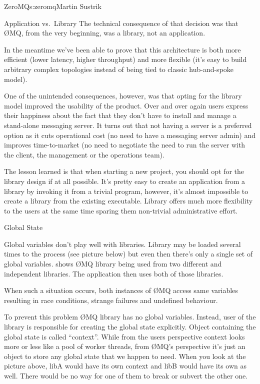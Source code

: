 \begin{aosachapter}{ZeroMQ}{s:zeromq}{Martin Sustrik}
\begin{aosasect1}{Application vs.\ Library}
The technical consequence of that decision was that {\O}MQ, from the very
beginning, was a library, not an application.

In the meantime we've been able to prove that this architecture is
both more efficient (lower latency, higher throughput) and more
flexible (it's easy to build arbitrary complex topologies instead of
being tied to classic hub-and-spoke model).

One of the unintended consequences, however, was that opting for the
library model improved the usability of the product. Over and over
again users express their happiness about the fact that they don't
have to install and manage a stand-alone messaging server. It turns
out that not having a server is a preferred option as it cuts
operational cost (no need to have a messaging server admin) and
improves time-to-market (no need to negotiate the need to run the
server with the client, the management or the operations team).

The lesson learned is that when starting a new project, you should opt
for the library design if at all possible. It's pretty easy to create
an application from a library by invoking it from a trivial program,
however, it's almost impossible to create a library from the existing
executable. Library offers much more flexibility to the users at the
same time sparing them non-trivial administrative effort.

\end{aosasect1}

\begin{aosasect1}{Global State}

Global variables don't play well with libraries. Library may be loaded
several times to the process (see picture below) but even then there's
only a single set of global
variables.  shows {\O}MQ library being
used from two different and independent libraries. The application
then uses both of those libraries.


When such a situation occurs, both instances of {\O}MQ access same
variables resulting in race conditions, strange failures and undefined
behaviour.

To prevent this problem {\O}MQ library has no global variables. Instead,
user of the library is responsible for creating the global state
explicitly. Object containing the global state is called
``context''. While from the users perspective context looks more or
less like a pool of worker threads, from {\O}MQ's perspective it's just
an object to store any global state that we happen to need. When you
look at the picture above, libA would have its own context and libB
would have its own as well. There would be no way for one of them to
break or subvert the other one.


\end{aosasect1}
\end{aosachapter}
